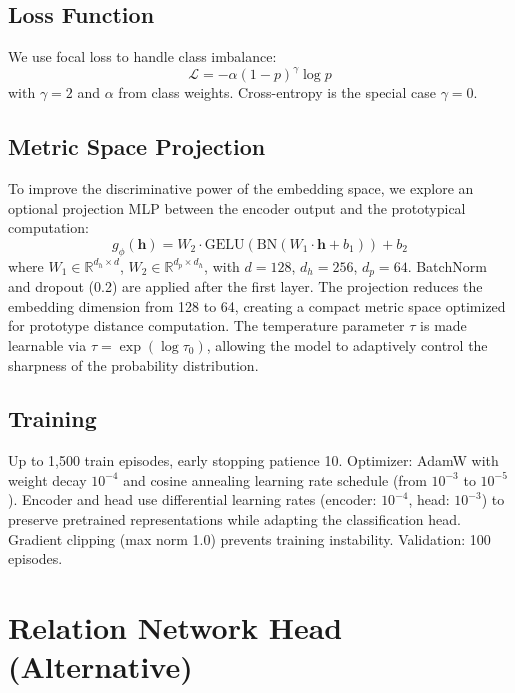 \subsection{Loss Function}

We use focal loss to handle class imbalance:
\begin{equation}
\mathcal{L} = -\alpha (1-p)^\gamma \log p
\end{equation}
with $\gamma = 2$ and $\alpha$ from class weights. Cross-entropy is the special case $\gamma = 0$.

\subsection{Metric Space Projection}

To improve the discriminative power of the embedding space, we explore an optional projection MLP between the encoder output and the prototypical computation:
\begin{equation}
g_\phi(\mathbf{h}) = W_2 \cdot \text{GELU}(\text{BN}(W_1 \cdot \mathbf{h} + b_1)) + b_2
\end{equation}
where $W_1 \in \mathbb{R}^{d_h \times d}$, $W_2 \in \mathbb{R}^{d_p \times d_h}$, with $d = 128$, $d_h = 256$, $d_p = 64$. BatchNorm and dropout (0.2) are applied after the first layer. The projection reduces the embedding dimension from 128 to 64, creating a compact metric space optimized for prototype distance computation. The temperature parameter $\tau$ is made learnable via $\tau = \exp(\log \tau_0)$, allowing the model to adaptively control the sharpness of the probability distribution.

\subsection{Training}

Up to 1,500 train episodes, early stopping patience 10. Optimizer: AdamW with weight decay $10^{-4}$ and cosine annealing learning rate schedule (from $10^{-3}$ to $10^{-5}$). Encoder and head use differential learning rates (encoder: $10^{-4}$, head: $10^{-3}$) to preserve pretrained representations while adapting the classification head. Gradient clipping (max norm 1.0) prevents training instability. Validation: 100 episodes.

\section{Relation Network Head (Alternative)}

